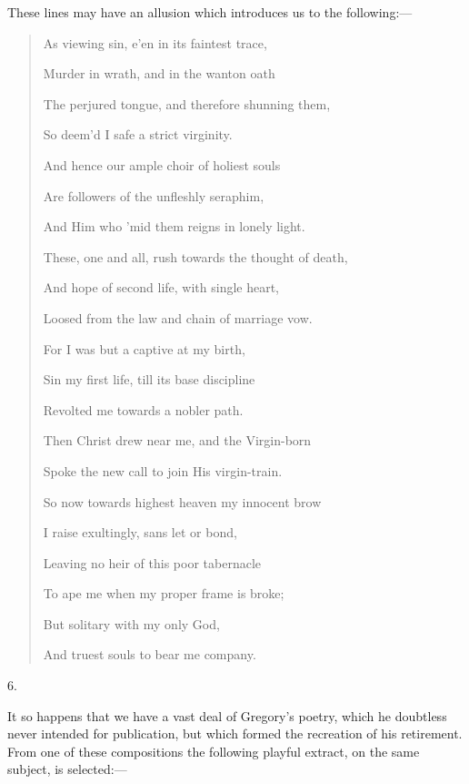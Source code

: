 These lines may have an allusion which introduces us to the
following:—

\begin{quote}

As viewing sin, e'en in its faintest trace,

Murder in wrath, and in the wanton oath

The perjured tongue, and therefore shunning them,

So deem'd I safe a strict virginity.

And hence our ample choir of holiest souls

Are followers of the unfleshly seraphim,

And Him who 'mid them reigns in lonely light.

These, one and all, rush towards the thought of death,

And hope of second life, with single heart,

Loosed from the law and chain of marriage vow.

For I was but a captive at my birth,

Sin my first life, till its base discipline

Revolted me towards a nobler path.

Then Christ drew near me, and the Virgin-born

Spoke the new call to join His virgin-train.

So now towards highest heaven my innocent brow

I raise exultingly, sans let or bond,

Leaving no heir of this poor tabernacle

To ape me when my proper frame is broke;

But solitary with my only God,

And truest souls to bear me company.
\end{quote}

6.

It so happens that we have a vast deal of Gregory's poetry, which
he doubtless never intended for publication, but which formed the
recreation of his retirement. From one of these compositions the
following playful extract, on the same subject, is selected:—

